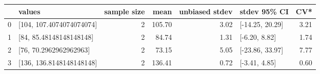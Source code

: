 \begin{tabular}{llrrrlr}
\toprule
 & values & sample size & mean & unbiased stdev & stdev 95\% CI & CV* \\
\midrule
0 & [104, 107.4074074074074] & 2 & 105.70 & 3.02 & [-14.25, 20.29] & 3.21 \\
1 & [84, 85.48148148148148] & 2 & 84.74 & 1.31 & [-6.20, 8.82] & 1.74 \\
2 & [76, 70.2962962962963] & 2 & 73.15 & 5.05 & [-23.86, 33.97] & 7.77 \\
3 & [136, 136.8148148148148] & 2 & 136.41 & 0.72 & [-3.41, 4.85] & 0.60 \\
\bottomrule
\end{tabular}
